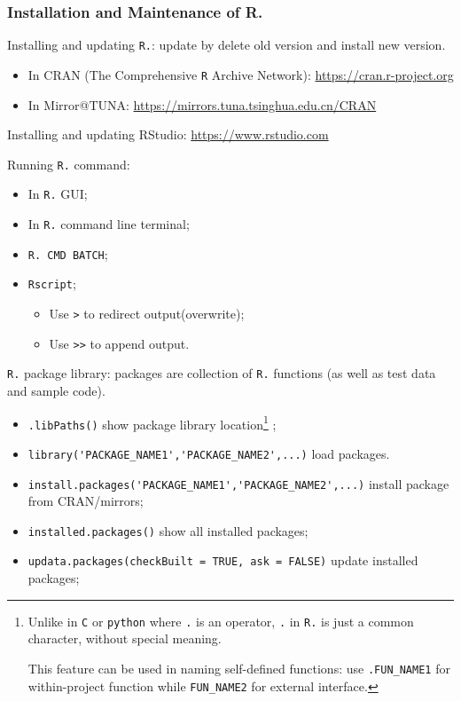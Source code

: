 \subsubsection{Installation and Maintenance of R.}

\noindent Installing and updating \lstinline|R.|: update by delete old version and install new version.
\begin{itemize}[topsep=2pt,itemsep=0pt]
    \item In CRAN (The Comprehensive \lstinline|R| Archive Network): \url{https://cran.r-project.org}
    \item In Mirror@TUNA: \url{https://mirrors.tuna.tsinghua.edu.cn/CRAN}
\end{itemize}

\noindent Installing and updating RStudio: \url{https://www.rstudio.com}


\noindent Running \lstinline|R.| command:
\begin{itemize}[topsep=2pt,itemsep=0pt]
    \item In \lstinline|R.| GUI;
    \item In \lstinline|R.| command line terminal;
    \item \lstinline|R. CMD BATCH|;
    \item \lstinline|Rscript|;
        \begin{itemize}[topsep=2pt,itemsep=0pt]
        \item Use \lstinline|>| to redirect output(overwrite);
        \item Use \lstinline|>>| to append output.
        \end{itemize}
\end{itemize}



\noindent \lstinline|R.| package library: packages are collection of \lstinline|R.| functions (as well as test data and sample code).
\begin{itemize}[topsep=2pt,itemsep=0pt]
    \item \lstinline|.libPaths()| show package library location\footnote{Unlike in \lstinline|C| or \lstinline|python| where \lstinline|.| is an operator, \lstinline|.| in \lstinline|R.| is just a common character, without special meaning.
    
    This feature can be used in naming self-defined functions: use \lstinline|.FUN_NAME1| for within-project function while \lstinline|FUN_NAME2| for external interface.} ;
    \item \lstinline|library('PACKAGE_NAME1','PACKAGE_NAME2',...)| load packages.
    \item \lstinline|install.packages('PACKAGE_NAME1','PACKAGE_NAME2',...)| install package from CRAN/mirrors;
    \item \lstinline|installed.packages()| show all installed packages;
    \item \lstinline|updata.packages(checkBuilt = TRUE, ask = FALSE)| update installed packages;
\end{itemize}


